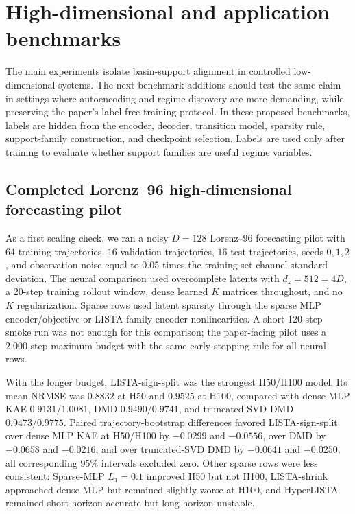 \section{High-dimensional and application benchmarks}
\label{app:benchmark_extensions}

The main experiments isolate basin-support alignment in controlled low-dimensional systems. The next benchmark additions should test the same claim in settings where autoencoding and regime discovery are more demanding, while preserving the paper's label-free training protocol. In these proposed benchmarks, labels are hidden from the encoder, decoder, transition model, sparsity rule, support-family construction, and checkpoint selection. Labels are used only after training to evaluate whether support families are useful regime variables.

\subsection{Completed Lorenz--96 high-dimensional forecasting pilot}
\label{app:lorenz96_highdim_pilot}

As a first scaling check, we ran a noisy \(D=128\) Lorenz--96 forecasting pilot with \(64\) training trajectories, \(16\) validation trajectories, \(16\) test trajectories, seeds \(0,1,2\), and observation noise equal to \(0.05\) times the training-set channel standard deviation. The neural comparison used overcomplete latents with \(d_z=512=4D\), a 20-step training rollout window, dense learned \(K\) matrices throughout, and no \(K\) regularization. Sparse rows used latent sparsity through the sparse MLP encoder/objective or LISTA-family encoder nonlinearities. A short 120-step smoke run was not enough for this comparison; the paper-facing pilot uses a 2,000-step maximum budget with the same early-stopping rule for all neural rows.

With the longer budget, LISTA-sign-split was the strongest H50/H100 model. Its mean NRMSE was \(0.8832\) at H50 and \(0.9525\) at H100, compared with dense MLP KAE \(0.9131/1.0081\), DMD \(0.9490/0.9741\), and truncated-SVD DMD \(0.9473/0.9775\). Paired trajectory-bootstrap differences favored LISTA-sign-split over dense MLP KAE at H50/H100 by \(-0.0299\) and \(-0.0556\), over DMD by \(-0.0658\) and \(-0.0216\), and over truncated-SVD DMD by \(-0.0641\) and \(-0.0250\); all corresponding 95\% intervals excluded zero. Other sparse rows were less consistent: Sparse-MLP \(L_1=0.1\) improved H50 but not H100, LISTA-shrink approached dense MLP but remained slightly worse at H100, and HyperLISTA remained short-horizon accurate but long-horizon unstable.

